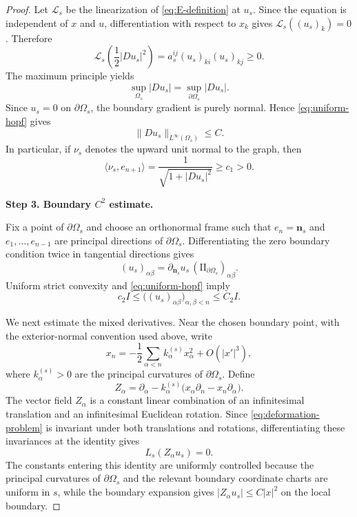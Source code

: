 \documentclass{article}
\numberwithin{equation}{section}
\begin{document}
\begin{proof}
Let $\mathcal L_s$ be the linearization of
\eqref{eq:E-definition} at $u_s$. Since the equation is independent of
$x$ and $u$, differentiation with respect to $x_k$ gives
$\mathcal L_s((u_s)_k)=0$. Therefore
\[
\mathcal L_s\left(\frac12|Du_s|^2\right)
=
a_s^{ij}(u_s)_{ki}(u_s)_{kj}\ge0.
\]
The maximum principle yields
\[
\sup_{\Omega_s}|Du_s|
=
\sup_{\partial\Omega_s}|Du_s|.
\]
Since $u_s=0$ on $\partial\Omega_s$, the boundary gradient is purely
normal. Hence \eqref{eq:uniform-hopf} gives
\begin{equation}\label{eq:uniform-c1}
\|Du_s\|_{L^\infty(\Omega_s)}\le C.
\end{equation}
In particular, if $\nu_s$ denotes the upward unit normal to the graph,
then
\begin{equation}\label{eq:uniform-angle}
\langle\nu_s,e_{n+1}\rangle
=
\frac{1}{\sqrt{1+|Du_s|^2}}
\ge c_1>0.
\end{equation}

\medskip
\noindent\textbf{Step 3. Boundary $C^2$ estimate.}

Fix a point of $\partial\Omega_s$ and choose an orthonormal frame such
that $e_n=\mathbf n_s$ and $e_1,\ldots,e_{n-1}$ are principal
directions of $\partial\Omega_s$. Differentiating the zero boundary
condition twice in tangential directions gives
\[
(u_s)_{\alpha\beta}
=
\partial_{\mathbf n_s}u_s\,
(\mathrm{II}_{\partial\Omega_s})_{\alpha\beta}.
\]
Uniform strict convexity and \eqref{eq:uniform-hopf} imply
\begin{equation}\label{eq:boundary-tangential}
c_2I\le
\bigl((u_s)_{\alpha\beta}\bigr)_{\alpha,\beta<n}
\le C_2I.
\end{equation}

We next estimate the mixed derivatives. Near the chosen boundary
point, with the exterior-normal convention used above, write
\[
x_n
=
-\frac12\sum_{\alpha<n}
k_\alpha^{(s)}x_\alpha^2+O(|x'|^3),
\]
where $k_\alpha^{(s)}>0$ are the principal curvatures of
$\partial\Omega_s$. Define
\[
Z_\alpha
=
\partial_\alpha
-
k_\alpha^{(s)}
\bigl(x_\alpha\partial_n-x_n\partial_\alpha\bigr).
\]
The vector field $Z_\alpha$ is a constant linear combination of
an infinitesimal translation and an infinitesimal Euclidean
rotation. Since \eqref{eq:deformation-problem} is invariant under both translations
and rotations, differentiating these invariances at the identity
gives
\[
L_s(Z_\alpha u_s)=0.
\]
The constants entering this identity are uniformly controlled
because the principal curvatures of $\partial\Omega_s$ and the
relevant boundary coordinate charts are uniform in $s$,
while the boundary expansion gives
$|Z_\alpha u_s|\le C|x|^2$ on the local boundary.


\end{proof}
\end{document}
